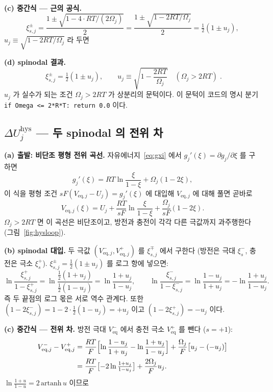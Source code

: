 \documentclass[11pt,a4paper]{article}
\newcommand{\eq}{\mathrm{eq}}
\newcommand{\hys}{\mathrm{hys}}
\newcommand{\code}[1]{\texttt{#1}}
\begin{document}
\textbf{(c) 중간식 — 근의 공식.}
\begin{equation}
\xi_{s,j}^\pm = \frac{1 \pm \sqrt{1 - 4\cdot RT/(2\Omega_j)}}{2}
= \frac{1 \pm \sqrt{1 - 2RT/\Omega_j}}{2}
= \tfrac12(1\pm u_j),
\label{eq:spinodalderiv}
\end{equation}
$u_j \equiv \sqrt{1-2RT/\Omega_j}$ 라 두면

\textbf{(d) spinodal 결과.}
\begin{equation}
\boxed{\;\xi_{s,j}^\pm=\tfrac12(1\pm u_j),\qquad
u_j\equiv\sqrt{1-\frac{2RT}{\Omega_j}}\quad(\Omega_j>2RT)\;.}
\label{eq:spinodal}
\end{equation}
$u_j$ 가 실수가 되는 조건 $\Omega_j>2RT$ 가 상분리의 문턱이다. 이 문턱이 코드의 명시 분기
\code{if Omega <= 2*R*T: return 0.0} 이다.

\subsection{$\Delta U_j^\hys$ — 두 spinodal 의 전위 차}

\textbf{(a) 출발: 비단조 평형 전위 곡선.} 자유에너지~\eqref{eq:gxi} 에서 $g_j'(\xi)=\partial g_j/\partial\xi$ 를 구하면
\begin{equation}
g_j'(\xi) = RT\ln\frac{\xi}{1-\xi} + \Omega_j(1-2\xi),
\label{eq:gder}
\end{equation}
이 식을 평형 조건 $sF(V_{\eq,j}-U_j)=g_j'(\xi)$ 에 대입해 $V_{\eq,j}$ 에 대해 풀면 곧바로
\begin{equation}
V_{\eq,j}(\xi) = U_j + \frac{RT}{sF}\ln\frac{\xi}{1-\xi} + \frac{\Omega_j}{sF}(1-2\xi).
\label{eq:Veq}
\end{equation}
$\Omega_j>2RT$ 면 이 곡선은 비단조이고, 방전과 충전이 각각 다른 극값까지 과주행한다
(그림~\ref{fig:hysloop}).

\textbf{(b) spinodal 대입.} 두 극값 $(V_{\eq,j}^-, V_{\eq,j}^+)$ 를 $\xi_{s,j}^\mp$ 에서 구한다
(방전은 극대 $\xi_s^-$, 충전은 극소 $\xi_s^+$).
$\xi_{s,j}^\pm = \tfrac12(1\pm u_j)$ 를 로그 항에 넣으면:
\begin{equation}
\ln\frac{\xi_{s,j}^+}{1-\xi_{s,j}^+}
= \ln\frac{\tfrac12(1+u_j)}{\tfrac12(1-u_j)}
= \ln\frac{1+u_j}{1-u_j},
\qquad
\ln\frac{\xi_{s,j}^-}{1-\xi_{s,j}^-}
= \ln\frac{1-u_j}{1+u_j} = -\ln\frac{1+u_j}{1-u_j}.
\label{eq:logitspinodal}
\end{equation}
즉 두 끝점의 로그 몫은 서로 역수 관계다. 또한
$(1-2\xi_{s,j}^-) = 1-2\cdot\tfrac12(1-u_j) = +u_j$ 이고
$(1-2\xi_{s,j}^+) = -u_j$ 이다.

\textbf{(c) 중간식 — 전위 차.} 방전 극대 $V_{\eq}^-$ 에서 충전 극소 $V_{\eq}^+$ 를 뺀다
($s=+1$):
\begin{align}
V_{\eq,j}^- - V_{\eq,j}^+
&= \frac{RT}{F}\Bigl[\ln\frac{1-u_j}{1+u_j} - \ln\frac{1+u_j}{1-u_j}\Bigr]
+ \frac{\Omega_j}{F}\bigl[u_j - (-u_j)\bigr] \notag\\
&= \frac{RT}{F}\bigl[-2\ln\tfrac{1+u_j}{1-u_j}\bigr] + \frac{2\Omega_j}{F}u_j.
\label{eq:Vdiff}
\end{align}
$\ln\tfrac{1+u}{1-u} = 2\,\mathrm{artanh}\,u$ 이므로
\end{document}
